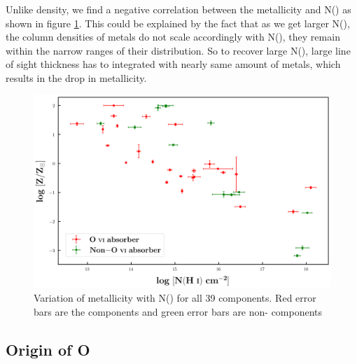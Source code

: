 Unlike density, we find a negative correlation between the metallicity and N() as shown in figure \ref{fig:Z-NHi}. This could be explained by the fact that as we get larger N(), the column densities of metals do not scale accordingly with N(), they remain within the narrow ranges of their distribution. So to recover large N(), large line of sight thickness has to integrated with nearly same amount of metals, which results in the drop in metallicity.


\begin{figure}
    \centering
    \includegraphics[width=\linewidth]{Figures/Z_vs_NHi.png}
    \caption{Variation of metallicity with N() for all 39 components. Red error bars are the  components and green error bars are non- components}
    \label{fig:Z-NHi}
\end{figure}


\subsection*{Origin of O \hspace*{-0.5mm}{\footnotesize VI}}

